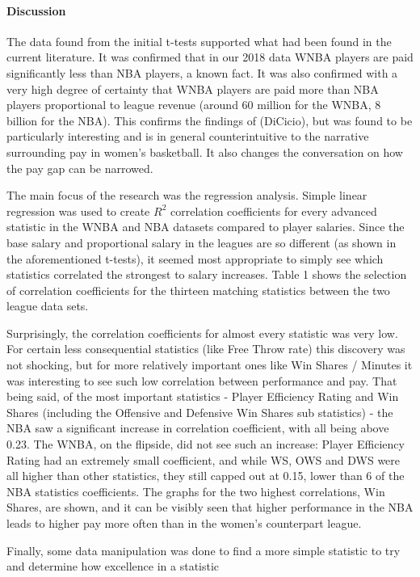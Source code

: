 \documentclass[12pt]{article}
\begin{document}
\paragraph{Discussion}
The data found from the initial t-tests supported what had been found in the current literature. It was confirmed that in 
our 2018 data WNBA players are paid significantly less than NBA players, a known fact. It was also confirmed with a very 
high degree of certainty that WNBA players are paid more than NBA players proportional to league revenue (around 60 
million for the WNBA, 8 billion for the NBA). This confirms the findings of (DiCicio), but was found to be particularly 
interesting and is in general counterintuitive to the narrative surrounding pay in women’s basketball. It also changes 
the conversation on how the pay gap can be narrowed.
\par
The main focus of the research was the regression analysis. Simple linear regression was used to create $R^2$ 
correlation coefficients for every advanced statistic in the WNBA and NBA datasets compared to player salaries. 
Since the base salary and proportional salary in the leagues are so different (as shown in the aforementioned t-tests), 
it seemed most appropriate to simply see which statistics correlated the strongest to salary increases. Table 1 shows 
the selection of correlation coefficients for the thirteen matching statistics between the two league data sets.
\par
Surprisingly, the correlation coefficients for almost every statistic was very low. For certain less consequential 
statistics (like Free Throw rate) this discovery was not shocking, but for more relatively important ones like Win 
Shares / Minutes it was interesting to see such low correlation between performance and pay. That being said, of the 
most important statistics - Player Efficiency Rating and Win Shares (including the Offensive and Defensive Win Shares 
sub statistics) - the NBA saw a significant increase in correlation coefficient, with all being above 0.23. The WNBA, 
on the flipside, did not see such an increase: Player Efficiency Rating had an extremely small coefficient, and while 
WS, OWS and DWS were all higher than other statistics, they still capped out at 0.15, lower than 6 of the NBA statistics 
coefficients. The graphs for the two highest correlations, Win Shares, are shown, and it can be visibly seen that higher
 performance in the NBA leads to higher pay more often than in the women’s counterpart league.
\par
Finally, some data manipulation was done to find a more simple statistic to try and determine how excellence in a statistic 
\end{document}
